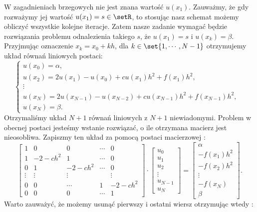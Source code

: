 W zagadnieniach brzegowych nie jest znana wartość $u(x_1)$. Zauważmy, że gdy rozważymy jej wartość $u(x_1) = s \in \setR$, to stosując nasz schemat możemy obliczyć wszystkie kolejne iteracje. Zatem nasze zadanie wymagać będzie rozwiązania problemu odnalezienia takiego $s$, że $u(x_1) = s$ i $u(x_k) = \beta$. Przyjmując oznaczenie $ x_k = x_0 + kh$, dla $ k \in \set{1, \cdots,N-1} $ otrzymujemy układ równań liniowych postaci:
\begin{equation}
\left\{ \begin{array}{ll}
u(x_0) = \alpha ,& \\
u(x_2) = 2u(x_1) - u(x_{0}) + cu(x_1)h^2 + f(x_1)h^2 ,& \\ 
\vdots  & \\
u(x_{N}) = 2u(x_{N-1}) - u(x_{N-2}) + cu(x_{N-1})h^2 + f(x_{N-1})h^2 , & \\
u(x_N) = \beta. &
\end{array} \right.
\end{equation}
Otrzymaliśmy układ $N+1$ równań liniowych z $N+1$ niewiadomymi. Problem w obecnej postaci jesteśmy wstanie rozwiązać, o ile otrzymana macierz jest nieosobliwa. Zapiszmy ten układ za pomocą postaci macierzowej :
$$ 
\left[ \begin{array}{ccccc}
1 & 0 & 0 & \cdots &0 \\
1 & -2-ch^2 & 1 &\cdots &0 \\
0 & 1 & -2-ch^2 &\cdots &0 \\
\vdots & \vdots & \vdots &  &\vdots \\
0& 0 & \cdots& 1 & -2-ch^2 \\
0 & 0 & 0&\cdots & 1 
\end{array} \right] \cdot
\left[ \begin{array}{c}
u_0 \\
u_1 \\
u_2 \\
\vdots \\
u_{N-1} \\
u_{N}  
\end{array} \right] =
\left[ \begin{array}{c}
\alpha \\
-f(x_1)h^2 \\
-f(x_2)h^2\\
\vdots \\
-f(x_{N}) \\
\beta   
\end{array} \right] .
$$
Warto zauważyć, że możemy usunąć pierwszy i ostatni wiersz otrzymując  wtedy :
